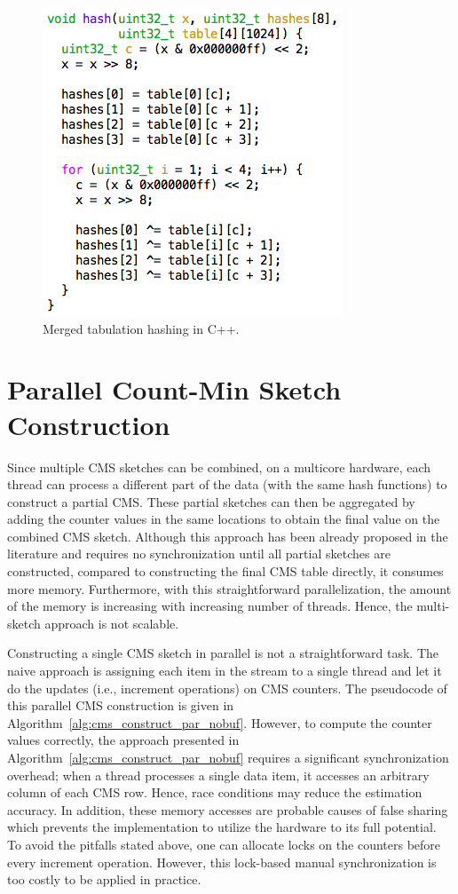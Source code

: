 \documentclass[10pt, review=true,sigconf]{acmart}
\begin{document}
\begin{figure}[htbp]
\begin{center}
\includegraphics[width=0.70\linewidth]{tabular_code_par}
\caption{Merged tabulation hashing  in C++.}
\label{fig:tabulation_merged}
\end{center}
\end{figure}

\section{Parallel Count-Min Sketch Construction}\label{sec:par}

Since multiple CMS sketches can be combined, on a multicore hardware, each thread can process a different part of the data (with the same hash functions) to construct a partial CMS. These partial sketches can then be aggregated by adding the counter values in the same locations to obtain the final value on the combined CMS sketch. Although this approach has been already proposed in the literature and requires no synchronization until all partial sketches are constructed, compared to constructing the final CMS table directly, it consumes more memory. Furthermore, with this straightforward parallelization, the amount of the memory is increasing with increasing number of threads. Hence, the multi-sketch approach is not scalable.

Constructing a single CMS sketch in parallel is not a straightforward task. The naive approach is assigning each item in the stream to a single thread and let it do the updates (i.e., increment operations) on CMS counters. The pseudocode of this parallel CMS construction is given in Algorithm~\ref{alg:cms_construct_par_nobuf}. However, to compute the counter values correctly, the approach presented in Algorithm~\ref{alg:cms_construct_par_nobuf} requires a significant synchronization overhead; when a thread processes a single data item, it accesses an arbitrary column of each CMS row. Hence, race conditions may reduce the estimation accuracy. In addition, these memory accesses are probable causes of false sharing which prevents the implementation to utilize the hardware to its full potential. To avoid the pitfalls stated above, one can allocate locks on the counters before every increment operation. However, this lock-based manual synchronization is too costly to be applied in practice. 
\end{document}
